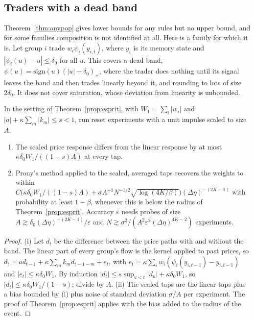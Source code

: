 \subsection{Traders with a dead band}

Theorem~\ref{thm:anypop} gives lower bounds for any rules but no upper bound, and for some families composition is not identified at all. Here is a family for which it is. Let group $i$ trade $w_i\psi_i(y_{i,t})$, where $y_i$ is its memory state and $|\psi_i(u)-u|\le\delta_0$ for all $u$. This covers a dead band, $\psi(u)=\mathrm{sign}(u)(|u|-\delta_0)_+$, where the trader does nothing until its signal leaves the band and then trades linearly beyond it, and rounding to lots of size $2\delta_0$. It does not cover saturation, whose deviation from linearity is unbounded.

\begin{proposition}\label{prop:deadband}
In the setting of Theorem~\ref{prop:esprit}, with $W_1=\sum_i|w_i|$ and $|a|+\kappa\sum_m|k_m|\le s<1$, run reset experiments with a unit impulse scaled to size $A$.
\begin{enumerate}[label=(\roman*),itemsep=1pt]
\item The scaled price response differs from the linear response by at most $\kappa\delta_0W_1/((1-s)A)$ at every tap.
\item Prony's method applied to the scaled, averaged taps recovers the weights to within $C\bigl(\kappa\delta_0W_1/((1-s)A)+\sigma A^{-1}N^{-1/2}\sqrt{\log(4K/\beta)}\bigr)(\Delta\eta)^{-(2K-1)}$ with probability at least $1-\beta$, whenever this is below the radius of Theorem~\ref{prop:esprit}. Accuracy $\varepsilon$ needs probes of size $A\gtrsim\delta_0(\Delta\eta)^{-(2K-1)}/\varepsilon$ and $N\gtrsim\sigma^2/(A^2\varepsilon^2(\Delta\eta)^{4K-2})$ experiments.
\end{enumerate}
\end{proposition}

\begin{proof}
(i) Let $d_t$ be the difference between the price paths with and without the band. The linear part of every group's flow is the kernel applied to past prices, so $d_t=ad_{t-1}+\kappa\sum_mk_md_{t-1-m}+e_t$, with $e_t=\kappa\sum_iw_i(\psi_i(y_{i,t-1})-y_{i,t-1})$ and $|e_t|\le\kappa\delta_0W_1$. By induction $|d_t|\le s\sup_{u<t}|d_u|+\kappa\delta_0W_1$, so $|d_t|\le\kappa\delta_0W_1/(1-s)$; divide by $A$. (ii) The scaled taps are the linear taps plus a bias bounded by (i) plus noise of standard deviation $\sigma/A$ per experiment. The proof of Theorem~\ref{prop:esprit} applies with the bias added to the radius of the event.
\end{proof}


